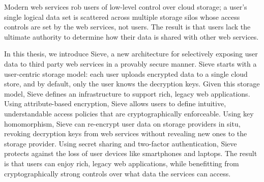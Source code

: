 % 
% 
%
Modern web services rob users of low-level
control over cloud storage; a user's single
logical data set is scattered across multiple
storage silos whose access controls are set
by the web services, not users. The result
is that users lack the ultimate authority
to determine how their data is shared with
other web services.

In this thesis, we introduce Sieve, a new
architecture for selectively exposing user
data to third party web services in a provably
secure manner. Sieve
starts with a user-centric storage model:
each user uploads encrypted data to a
single cloud store, and by default, only
the user knows the decryption keys. Given
this storage model, Sieve defines an
infrastructure to support rich, legacy web
applications. Using attribute-based encryption,
Sieve allows users to define intuitive, 
understandable access policies that are
cryptographically enforceable. Using key
homomorphism, Sieve can re-encrypt user
data on storage providers in situ, revoking
decryption keys from web services without
revealing new ones to the storage provider.
Using secret sharing and two-factor authentication,
Sieve protects against the loss of user
devices like smartphones and laptops. The
result is that users can enjoy rich, legacy
web applications, while benefitting from
cryptographically strong controls over
what data the services can access.